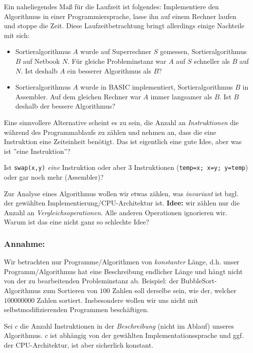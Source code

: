 \documentclass{article}
\begin{document}
Ein naheliegendes Maß für die Laufzeit ist folgendes: Implementiere den Algorithmus in einer Programmiersprache,
lasse ihn auf einem Rechner laufen und stoppe die Zeit. Diese Laufzeitbetrachtung bringt allerdings 
einige Nachteile mit sich:
\begin{itemize}
\item Sortieralgorithmus $A$ wurde auf Superrechner $S$ gemessen, Sortieralgorithmus $B$ auf 
	Netbook $N$. Für gleiche  Probleminstanz war $A$ auf $S$ schneller als $B$ auf $N$.
	Ist deshalb $A$ ein besserer Algorithmus als $B$?
\item Sortieralgorithmus $A$ wurde in BASIC implementiert, Sortieralgorithmus $B$ in Assembler. Auf dem
	gleichen Rechner war $A$ immer langsamer als $B$. Ist $B$ deshalb der bessere Algorithmus? 
\end{itemize}

Eine sinnvollere Alternative scheint es zu sein, die Anzahl an \emph{Instruktionen} die während des Programmablaufs
zu zählen und nehmen an, dass die eine Instruktion eine Zeiteinheit benötigt. Das ist eigentlich eine gute Idee,
aber was ist ''eine Instruktion''?

Ist \texttt{swap(x,y)} \emph{eine} Instruktion oder aber $3$ Instruktionen (\texttt{temp=x; x=y; y=temp}) oder gar 
noch mehr (Assembler)? 

Zur Analyse eines Algorithmus wollen wir etwas zählen, was \emph{invariant} ist bzgl. der gewählten Implementierung/CPU-Architektur
ist.  
{\bf Idee:} wir zählen nur die Anzahl an \emph{Vergleichsoperationen}. Alle anderen Operationen ignorieren wir.
Warum ist das eine nicht ganz so schlechte Idee?


\subsubsection{Annahme:} Wir betrachten nur Programme/Algorithmen von \emph{konstanter} Länge, d.h. unser Programm/Algorithmus hat
eine Beschreibung endlicher Länge und hängt nicht von der zu bearbeitenden Probleminstanz ab. Beispiel: der BubbleSort-Algorithmus zum Sortieren
von $100$ Zahlen soll derselbe sein, wie der, welcher $100000000$ Zahlen sortiert.
Insbesondere wollen wir uns nicht mit selbstmodifizierenden Programmen beschäftigen.


Sei $c$ die Anzahl Instruktionen in der \emph{Beschreibung} (nicht im Ablauf) unseres Algorithmus. $c$ ist abhängig von der gewählten
Implementationssprache und ggf. der CPU-Architektur, ist aber sicherlich konstant.
\end{document}
